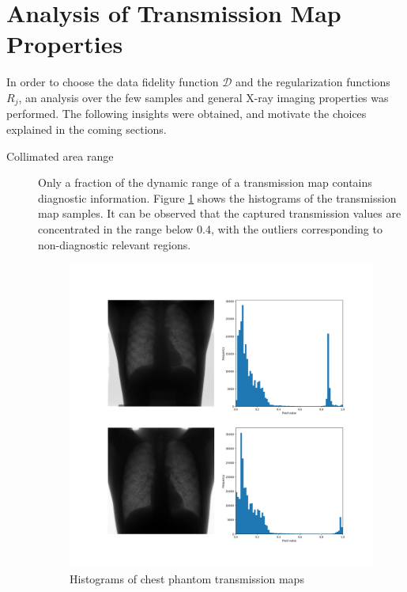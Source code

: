 \documentclass[nomenclature, english, bibtex]{kththesis}
\numberwithin{listing}{chapter}
\begin{document}
\section{Analysis of Transmission Map Properties}
\label{sec:transmissionMapProperties}


In order to choose the data fidelity function $\mathcal{D}$ and the regularization functions $R_j$, an
analysis over the few samples and general X-ray imaging properties was performed. The following insights
were obtained, and motivate the choices explained in the coming sections.

\begin{description}
    \item[Collimated area range] Only a fraction of the dynamic range of a transmission map
   contains diagnostic information. Figure \ref{fig:transmissionMapsHistograms} shows the histograms
   of the transmission map samples. It can be observed that the captured transmission values are concentrated in
  the range below 0.4, with the outliers corresponding to non-diagnostic relevant regions.
  \begin{figure}[H]
        \centering
        \includegraphics[width=1.0\textwidth]{figures/transmission_maps_histograms.png}
        \caption{Histograms of chest phantom transmission maps}
        \label{fig:transmissionMapsHistograms}
    \end{figure}


\end{description}
\end{document}
